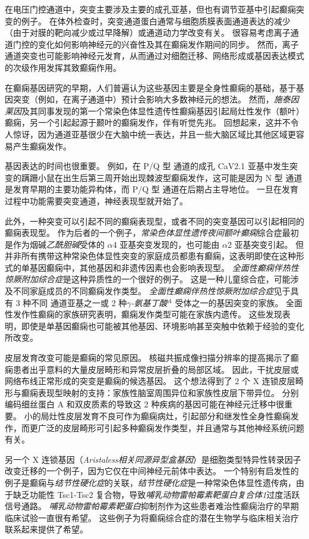 在电压门控通道中，突变主要涉及主要的成孔亚基，但也有调节亚基中引起癫痫突变的例子。
在体外检查时，突变通道蛋白通常与细胞质膜表面通道表达的减少（由于对膜的靶向减少或过早降解）或通道动力学改变有关。
很容易考虑离子通道门控的变化如何影响神经元的兴奋性及其在癫痫发作期间的同步。
然而，离子通道突变也可能影响神经元发育，从而通过对细胞迁移、网络形成或基因表达模式的次级作用发挥其致癫痫作用。


在癫痫基因研究的早期，人们普遍认为这些基因主要是全身性癫痫的基础，基于基因突变（例如，在离子通道中）预计会影响大多数神经元的想法。
然而，\textit{施泰因莱因}及其同事发现的第一个常染色体显性遗传性癫痫基因引起局灶性发作（额叶）癫痫，另一个引起起源于颞叶的癫痫发作，伴有听觉先兆。
回想起来，这并不令人惊讶，因为通道亚基很少在大脑中统一表达，并且一些大脑区域比其他区域更容易产生癫痫发作。


基因表达的时间也很重要。
例如，在 P/Q 型  通道的成孔 CaV2.1 亚基中发生突变的蹒跚小鼠在出生后第三周开始出现棘波型癫痫发作，这可能是因为 N 型  通道是发育早期的主要功能异构体，而 P/Q 型  通道在后期占主导地位。
一旦在发育过程中功能需要突变通道，神经表现型就开始了。


此外，一种突变可以引起不同的癫痫表现型，或者不同的突变基因可以引起相同的癫痫表现型。
作为后者的一个例子，\textit{常染色体显性遗传夜间额叶癫痫}综合症最初是作为烟碱\textit{乙酰胆碱}受体的 $\alpha$4 亚基突变发现的，也可能由 $\alpha$2 亚基突变引起。
但并非所有携带这种常染色体显性突变的家庭成员都患有癫痫，这表明即使在这种形式的单基因癫痫中，其他基因和非遗传因素也会影响表现型。
\textit{全面性癫痫伴热性惊厥附加综合症}是这种异质性的一个很好的例子。 这是一种儿童综合症，可能涉及不同家庭成员的不同癫痫发作类型。
\textit{全面性癫痫伴热性惊厥附加综合症}见于具有 3 种不同  通道亚基之一或 2 种\textit{$\gamma$-氨基丁酸}$^A$ 受体之一的基因突变的家族。
全面性发作性癫痫的家族研究表明，癫痫发作类型可能在家族内遗传。
这些发现表明，即使是单基因癫痫也可能被其他基因、环境影响甚至突触中依赖于经验的变化所改变。


皮层发育改变可能是癫痫的常见原因。
核磁共振成像扫描分辨率的提高揭示了癫痫患者出乎意料的大量皮层畸形和异常皮层折叠的局部区域。
因此，干扰皮层或网络布线正常形成的突变是癫痫的候选基因。
这个想法得到了 2 个 X 连锁皮层畸形与癫痫表现型映射的支持：家族性脑室周围异位和家族性皮层下带异位。
分别编码细丝蛋白 A 和双皮质素的导致这 2 种疾病的基因可能在神经元迁移中很重要。
小的局灶性皮层发育不良可作为癫痫病灶，引起部分和继发性全身性癫痫发作，而更广泛的皮层畸形可引起多种癫痫发作类型，并且通常与其他神经系统问题有关。


另一个 X 连锁基因（\textit{Aristaless相关同源异型盒基因}）是细胞类型特异性转录因子改变迁移的一个例子，因为它仅在中间神经元前体中表达。
一个特别有启发性的例子是癫痫与\textit{结节性硬化症}的关联，\textit{结节性硬化症}是一种常染色体显性遗传病，由于缺乏功能性 Tsc1-Tsc2 复合物，导致\textit{哺乳动物雷帕霉素靶蛋白复合体1}过度活跃信号通路。
\textit{哺乳动物雷帕霉素靶蛋白}抑制剂作为这些患者难治性癫痫治疗的早期临床试验一直很有希望。
这些例子为将癫痫综合症的潜在生物学与临床相关治疗联系起来提供了希望。


